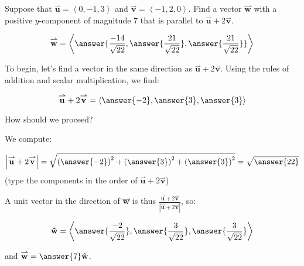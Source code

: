 \documentclass{ximera}
\author{Jim Talamo}
\begin{document}
\begin{exercise}
Suppose that $\overset{\boldsymbol{\rightharpoonup}}{\mathbf{u}} = \left\langle 0,-1,3 \right\rangle$ and $\overset{\boldsymbol{\rightharpoonup}}{\mathbf{v}} =
\left\langle -1,2,0 \right\rangle$.  Find a vector
$\overset{\boldsymbol{\rightharpoonup}}{\mathbf{w}}$  with a positive $y$-component of magnitude $7$ that is parallel to $\overset{\boldsymbol{\rightharpoonup}}{\mathbf{u}}+2\overset{\boldsymbol{\rightharpoonup}}{\mathbf{v}}$.

\[
\overset{\boldsymbol{\rightharpoonup}}{\mathbf{w}} = \left\langle \answer{\frac{-14}{\sqrt{22}}, \answer{ \frac{21}{\sqrt{22}} } , \answer{ \frac{21}{\sqrt{22}} }} \right\rangle
\]

\begin{hint}
To begin, let's find a vector in the same direction as $\overset{\boldsymbol{\rightharpoonup}}{\mathbf{u}}+2\overset{\boldsymbol{\rightharpoonup}}{\mathbf{v}}$.  Using the rules of addition and scalar multiplication, we find:

\[
\overset{\boldsymbol{\rightharpoonup}}{\mathbf{u}}+2\overset{\boldsymbol{\rightharpoonup}}{\mathbf{v}} = \left\langle \answer{-2} , \answer{3} , \answer{3} \right\rangle
\]

How should we proceed?

\begin{multipleChoice}
\end{multipleChoice}

We compute:

\[
\left|\overset{\boldsymbol{\rightharpoonup}}{\mathbf{u}}+2\overset{\boldsymbol{\rightharpoonup}}{\mathbf{v}}\right| = \sqrt{\left( \answer{-2} \right)^2+\left(  \answer{3} \right)^2+\left(  \answer{3}\right)^2 }  = \sqrt{\answer{22}}
\]
(type the components in the order of $\overset{\boldsymbol{\rightharpoonup}}{\mathbf{u}}+2\overset{\boldsymbol{\rightharpoonup}}{\mathbf{v}}$)

A unit vector in the direction of $\overset{\boldsymbol{\rightharpoonup}}{\mathbf{w}}$ is thus $\frac{\overset{\boldsymbol{\rightharpoonup}}{\mathbf{u}}+2\overset{\boldsymbol{\rightharpoonup}}{\mathbf{v}}}{\left|\overset{\boldsymbol{\rightharpoonup}}{\mathbf{u}}+2\overset{\boldsymbol{\rightharpoonup}}{\mathbf{v}}\right|}$, so:

\[
\mathbf{\hat{w}} = \left\langle \answer{\frac{-2}{\sqrt{22}} }, \answer{ \frac{3}{\sqrt{22}} } , \answer{ \frac{3}{\sqrt{22}} } \right\rangle
\]

and  $\overset{\boldsymbol{\rightharpoonup}}{\mathbf{w}} = \answer{7} \mathbf{\hat{w}}$.
\end{hint}

\end{exercise}
\end{document}
